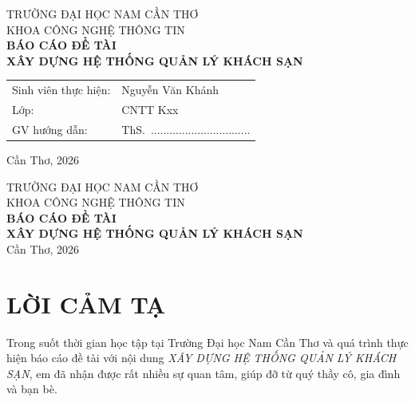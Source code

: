 \documentclass[13pt,a4paper]{extreport}
\newcommand{\TenDeTai}{XÂY DỰNG HỆ THỐNG QUẢN LÝ KHÁCH SẠN}
\newcommand{\Khoa}{CÔNG NGHỆ THÔNG TIN}
\newcommand{\Truong}{TRƯỜNG ĐẠI HỌC NAM CẦN THƠ}
\newcommand{\SVOne}{Nguyễn Văn Khánh}
\newcommand{\Lop}{CNTT Kxx}
\newcommand{\GVHD}{ThS.\ ................................}
\begin{document}
\begin{titlepage}
  \begin{center}
    {\large \Truong}\\[6pt]
    {\large KHOA \Khoa}\\[3cm]

    {\Large\bfseries BÁO CÁO ĐỀ TÀI}\\[1cm]
    {\Large\bfseries \TenDeTai}\\[3cm]

    \begin{tabular}{ll}
      Sinh viên thực hiện: & \SVOne \\
      Lớp:                 & \Lop \\
      GV hướng dẫn:        & \GVHD \\
    \end{tabular}

    \vfill
    {\large Cần Thơ, 2026}
  \end{center}
\end{titlepage}

\begin{titlepage}
  \begin{center}
    {\large \Truong}\\[6pt]
    {\large KHOA \Khoa}\\[3cm]

    {\Large\bfseries BÁO CÁO ĐỀ TÀI}\\[1cm]
    {\Large\bfseries \TenDeTai}\\[3cm]

    \vfill
    {\large Cần Thơ, 2026}
  \end{center}
\end{titlepage}


\chapter*{LỜI CẢM TẠ}

Trong suốt thời gian học tập tại Trường Đại học Nam Cần Thơ và quá trình thực hiện báo cáo đề tài với nội dung \emph{\TenDeTai}, em đã nhận được rất nhiều sự quan tâm, giúp đỡ từ quý thầy cô, gia đình và bạn bè.
\end{document}
